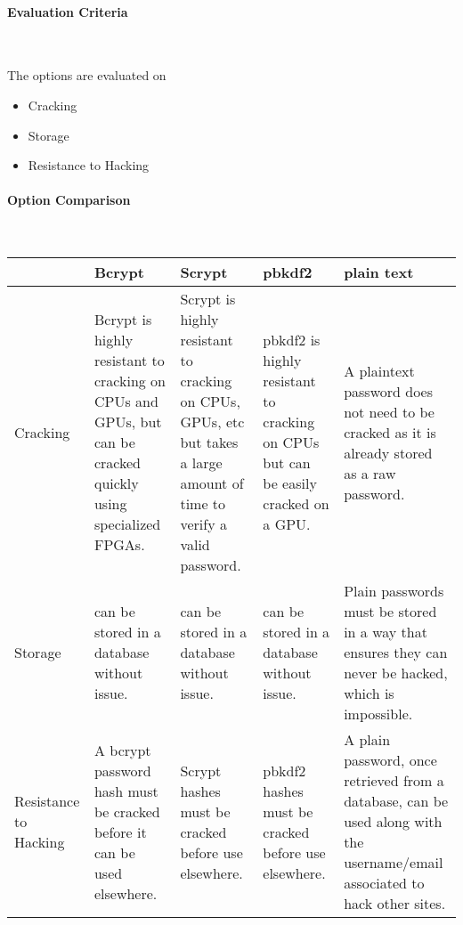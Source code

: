 \documentclass[letterpaper, 10pt, draftclsnofoot, compsoc, onecolumn]{IEEEtran}
\begin{document}
{\medskip
\newpage
\paragraph{Evaluation Criteria} ~\\
{\noindent The options are evaluated on

\begin{itemize}
\item Cracking
\item Storage
\item Resistance to Hacking
\end{itemize}

 \par}


\newpage
\paragraph{Option Comparison} ~\\
\vspace{1pc}
\tablehead{}
\begin{supertabular}{|p{2cm}|p{2.5cm}|p{2.5cm}|p{2.5cm}|p{2.5cm}|}
\hline
  & Bcrypt
  & Scrypt
  & pbkdf2
  & plain text \\ \hline
Cracking
  & Bcrypt is highly resistant to cracking on CPUs and GPUs, but can be cracked quickly using specialized FPGAs.
  & Scrypt is highly resistant to cracking on CPUs, GPUs, etc but takes a large amount of time to verify a valid password.
  & pbkdf2 is highly resistant to cracking on CPUs but can be easily cracked on a GPU.
  & A plaintext password does not need to be cracked as it is already stored as a raw password. \\ \hline
Storage
  & can be stored in a database without issue.
  & can be stored in a database without issue.
  & can be stored in a database without issue.
  & Plain passwords must be stored in a way that ensures they can never be hacked, which is impossible. \\ \hline
Resistance to Hacking
  & A bcrypt password hash must be cracked before it can be used elsewhere.
  & Scrypt hashes must be cracked before use elsewhere.
  & pbkdf2 hashes must be cracked before use elsewhere.
  & A plain password, once retrieved from a database, can be used along with the username/email associated to hack other sites. \\ \hline 
\end{supertabular}

}
\end{document}
